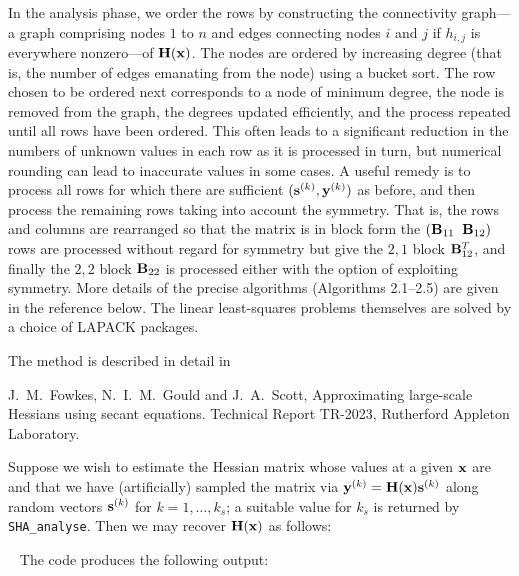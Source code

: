 \documentclass{galahad}
\newcommand{\packagename}{SHA}
\begin{document}
In the analysis phase, we order the rows by constructing the connectivity
graph---a graph comprising nodes $1$ to $n$ and edges connecting 
nodes $i$ and $j$ if $h_{i,j}$ is everywhere nonzero---of ${\mathbf{H}}({\mathbf{x}})$.
The nodes are ordered by increasing degree (that is, the number of edges
emanating from the node) using a bucket sort. The row chosen to be
ordered next corresponds to a node of minimum degree, the node
is removed from the graph, the degrees updated efficiently, and the
process repeated until all rows have been ordered. This often leads
to a significant reduction in the numbers of unknown values in each
row as it is processed in turn, but numerical rounding can lead to
inaccurate values in some cases. A useful remedy is to process all
rows for which there are sufficient $({\mathbf{s}}^{(k)}, {\mathbf{y}}^{(k)})$ as before,
and then process the remaining rows taking into account the symmetry.
That is, the rows and columns are rearranged so that the matrix
is in block form
the $( {\mathbf{B}}_{11} \;\; {\mathbf{B}}_{12})$ rows are processed without regard
for symmetry but give the $2,1$ block ${\mathbf{B}}^T_{12}$, and finally
the $2,2$ block ${\mathbf{B}}_{22}$ is processed either with the option of exploiting
symmetry. More details of the precise algorithms (Algorithms 2.1--2.5)
are given in the reference below. The linear least-squares problems  
themselves are solved by a choice of LAPACK packages.

\vspace*{1mm}

\galreference
\vspace*{1mm}

\noindent
The method is described in detail in
\vspace*{1mm}

\noindent

J.\ M.\ Fowkes, N.\ I.\ M.\ Gould and J.\ A.\ Scott,
Approximating large-scale Hessians using secant equations.
Technical Report TR-2023, Rutherford Appleton Laboratory.


\galexamples
Suppose we wish to estimate the Hessian matrix whose values at
a given ${\mathbf{x}}$ are
and that we have (artificially) sampled the matrix via
${\mathbf{y}}^{(k)} = {\mathbf{H}}({\mathbf{x}}) {\mathbf{s}}^{(k)}$ along random vectors
${\mathbf{s}}^{(k)}$ for $k = 1, \ldots, k_s$; a suitable value for $k_s$ is
returned by {\tt \packagename\_analyse}. Then we may recover ${\mathbf{H}}({\mathbf{x}})$
as follows:

{\tt \small
\VerbatimInput{\packageexample}
}
\noindent
The code produces the following output:
{\tt \small
\VerbatimInput{\packageresults}
}
\noindent
\end{document}
